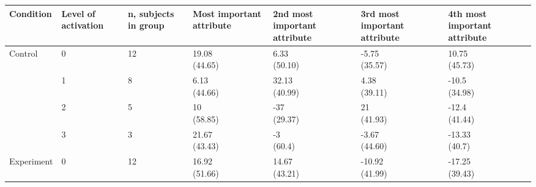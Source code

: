 



\begin{table*}
  \centering

  \begingroup
    \footnotesize
    \begin{tabularx}{\textwidth}{XXXXXXX}
      \toprule
      
      Condition
      & Level of activation
      & n, subjects in group
      & Most important attribute
      & 2nd most important attribute
      & 3rd most important attribute
      & 4th most important attribute
      \\

      \midrule


      Control
      & 0
      & 12
      & \cellcontent{19.08\\(44.65)}
      & \cellcontent{6.33\\(50.10)}
      & \cellcontent{-5.75\\(35.57)}
      & \cellcontent{10.75\\(45.73)}
      \\

      & 1
      & 8
      & \cellcontent{6.13\\(44.66)}
      & \cellcontent{32.13\\(40.99)}
      & \cellcontent{4.38\\(39.11)}
      & \cellcontent{-10.5\\(34.98)}
      \\

      & 2
      & 5
      & \cellcontent{10\\(58.85)}
      & \cellcontent{-37\\(29.37)}
      & \cellcontent{21\\(41.93)}
      & \cellcontent{-12.4\\(41.44)}
      \\

      & 3
      & 3
      & \cellcontent{21.67\\(43.43)}
      & \cellcontent{-3\\(60.4)}
      & \cellcontent{-3.67\\(44.60)}
      & \cellcontent{-13.33\\(40.7)}
      \\

      Experiment
      & 0
      & 12
      & \cellcontent{16.92\\(51.66)}
      & \cellcontent{14.67\\(43.21)}
      & \cellcontent{-10.92\\(41.99)}
      & \cellcontent{-17.25\\(39.43)}
      \\


\end{tabularx}
\end{table*}
